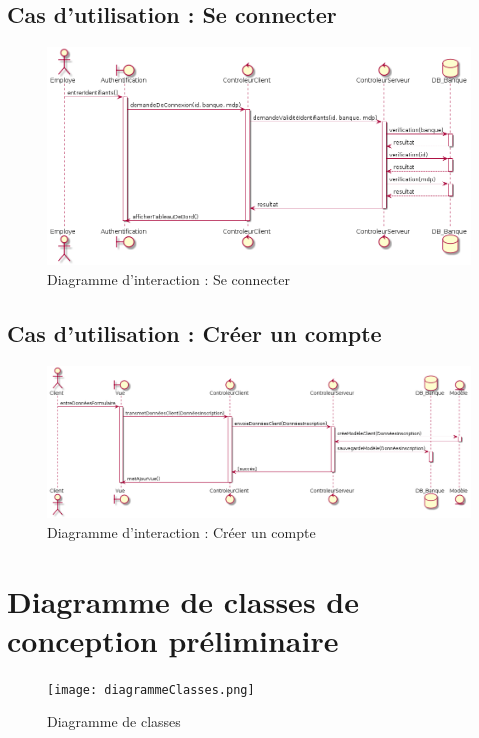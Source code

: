 \subsection{Cas d'utilisation : Se connecter}
\begin{figure}[h!]
\begin{center}
   \caption{Diagramme d'interaction : Se connecter}
   \includegraphics[scale=0.5]{images/seConnecterIR.png}
   \end{center}
\end{figure}
\subsection{Cas d'utilisation : Créer un compte}
\begin{figure}[h!]
\begin{center}
   \caption{Diagramme d'interaction : Créer un compte}
   \includegraphics[scale=0.4]{images/SInscrire.png}
   \end{center}
\end{figure}
\newpage
\section{Diagramme de classes de conception préliminaire}
\begin{figure}[h!]
\begin{center}
   \caption{Diagramme de classes}
   \texttt{[image: diagrammeClasses.png]}
   \end{center}
\end{figure}